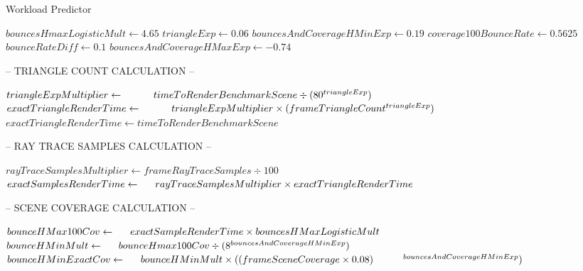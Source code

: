 ﻿\documentclass{article}
\begin{document}
    \begin{algorithm}
        \caption{Workload Predictor}\label{alg:cap}
        \begin{algorithmic}[1]
            \State $bouncesHmaxLogisticMult \gets 4.65$
            \State $triangleExp \gets 0.06$
            \State $bouncesAndCoverageHMinExp \gets 0.19$
            \State $coverage100BounceRate \gets 0.5625$
            \State $bounceRateDiff \gets 0.1$
            \State $bouncesAndCoverageHMaxExp \gets -0.74$
            \newline
            \newline
            \iftrue
            -- TRIANGLE COUNT CALCULATION --
            \fi
            \newline
                \State $triangleExpMultiplier \gets \newline \indent \indent timeToRenderBenchmarkScene \div (80 ^ {triangleExp})$
                \State $exactTriangleRenderTime \gets \newline \indent \indent triangleExpMultiplier \times (frameTriangleCount ^ {triangleExp})$
            \Else
                \State $exactTriangleRenderTime \gets timeToRenderBenchmarkScene$
            \EndIf
            \newline
            \newline
            \iftrue
            -- RAY TRACE SAMPLES CALCULATION --
            \fi
            \newline
            \State $rayTraceSamplesMultiplier \gets frameRayTraceSamples \div 100$
            \State $exactSamplesRenderTime \gets \newline \indent rayTraceSamplesMultiplier \times exactTriangleRenderTime$
            \newline
            \newline
            \iftrue
            -- SCENE COVERAGE CALCULATION --
            \fi
            \newline
            \State $bounceHMax100Cov \gets \newline \indent exactSampleRenderTime \times bouncesHMaxLogisticMult$
            \State $bounceHMinMult \gets \newline \indent bounceHmax100Cov \div (8 ^ {bouncesAndCoverageHMinExp})$
            \State $bounceHMinExactCov \gets \newline \indent bounceHMinMult \times ((frameSceneCoverage \times 0.08) \newline \indent \indent ^ {bouncesAndCoverageHMinExp})$

\end{algorithmic}
\end{algorithm}
\end{document}
